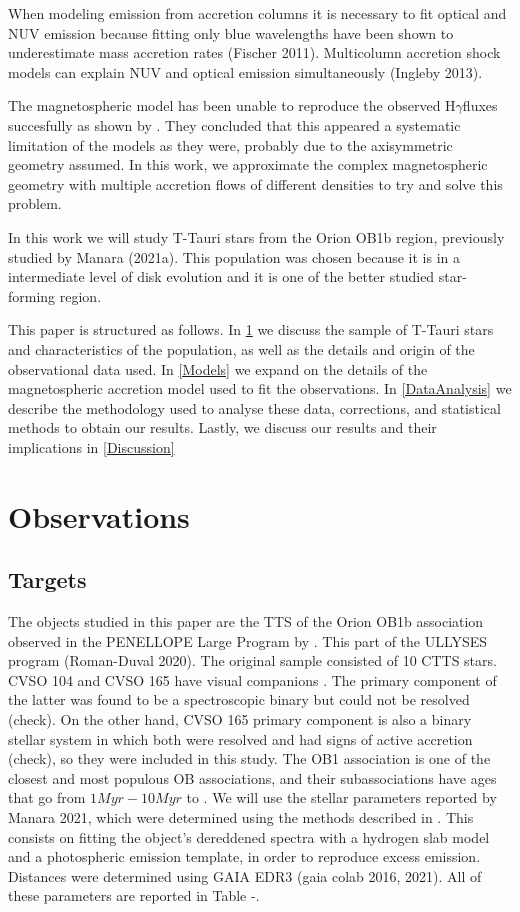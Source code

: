 \documentclass[twocolumn,linenumbers]{aastex631}
\newcommand{\hgamma}{H$\gamma$}
\begin{document}
When modeling emission from accretion columns it is necessary to fit optical and NUV emission because fitting only blue wavelengths have been shown to underestimate mass accretion rates (Fischer 2011). Multicolumn accretion shock models can explain NUV and optical emission simultaneously (Ingleby 2013).

The magnetospheric model has been unable to reproduce the observed \hgamma fluxes succesfully as shown by \citet{micolta2023}. They concluded that this appeared a systematic limitation of the models as they were, probably due to the axisymmetric geometry assumed. In this work, we approximate the complex magnetospheric geometry with multiple accretion flows of different densities to try and solve this problem.

In this work we will study T-Tauri stars from the Orion OB1b region, previously studied by Manara (2021a). This population was chosen because it is in a intermediate level of disk evolution and it is one of the better studied star-forming region. 

This paper is structured as follows. In \ref{Sample and observations} we discuss the sample of T-Tauri stars and characteristics of the population, as well as the details and origin of the observational data used. In \ref{Models} we expand on the details of the magnetospheric accretion model used to fit the observations. In \ref{DataAnalysis} we describe the methodology used to analyse these data, corrections, and statistical methods to obtain our results. Lastly, we discuss our results and their implications in \ref{Discussion}



\section{Observations} \label{Sample and observations}

\subsection{Targets}
The objects studied in this paper are the TTS of the Orion OB1b association observed in the PENELLOPE Large Program by \citep{manara2021}. This part of the ULLYSES program (Roman-Duval 2020). The original sample consisted of 10 CTTS stars. CVSO 104 and CVSO 165 have visual companions \citep{manara2021a}. The primary component of the latter was found to be a spectroscopic binary but could not be resolved (check). On the other hand, CVSO 165 primary component is also a binary stellar system in which both were resolved and had signs of active accretion (check), so they were included in this study. The OB1 association is one of the closest and most populous OB associations, and their subassociations have ages that go from $1Myr-10Myr$ to \citep{blaauw1994}.  We will use the stellar parameters reported by Manara 2021, which were determined using the methods described in \citep{manara2013a}. This consists on fitting the object's dereddened spectra with a hydrogen slab model and a photospheric emission template, in order to reproduce excess emission. Distances were determined using GAIA EDR3 (gaia colab 2016, 2021). All of these parameters are reported in Table -. 
\end{document}
